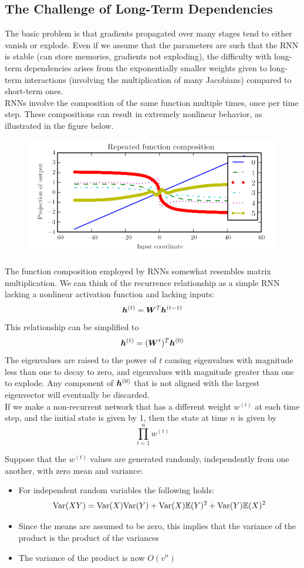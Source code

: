 \begin{multicols}{2}
	\subsection{The Challenge of Long-Term Dependencies}
	The basic problem is that gradients propagated over many stages tend to either vanish or explode.
	Even if we assume that the parameters are such that the RNN is stable (can store memories, gradients not exploding), the difficulty with long-term dependencies arises from the exponentially smaller weights given to long-term interactions (involving the multiplication of many Jacobians) compared to short-term ones.\\
	RNNs involve the composition of the same function multiple times, once per time step.
	These compositions can result in extremely nonlinear behavior, as illustrated in the figure below.
	\begin{figure}[H]
		\centering
		\includegraphics[width=0.9\linewidth]{images/unstable.png}
	\end{figure}
	The function composition employed by RNNs somewhat resembles matrix multiplication.
	We can think of the recurrence relationship as a simple RNN lacking a nonlinear activation function and lacking inputs:
	\[ {\bm{h}}^{(t)} = {\bm{W}}^T{\bm{h}}^{(t-1)} \]
	This relationship can be simplified to
	\[ {\bm{h}}^{(t)} = ({\bm{W}}^t)^T {\bm{h}}^{(0)} \]
	The eigenvalues are raised to the power of $t$ causing eigenvalues with magnitude less than one to decay to zero, and eigenvalues with magnitude greater than one to explode.
	Any component of ${\bm{h}}^{(0)}$ that is not aligned with the largest eigenvector will eventually be discarded.\\

	If we make a non-recurrent network that has a different weight $w^{(t)}$ at each time step, and the initial state is given by 1, then the state at time $n$ is given by
	\[ \prod_{t=1}^{n}w^{(t)} \]

	Suppose that the $w^{(t)}$ values are generated randomly, independently from one another, with zero mean and variance:
	\begin{itemize}
		\item For independent random variables the following holds:
		\[ \text{Var}(XY) = \text{Var}(X)\text{Var}(Y)+\text{Var}(X)\mathbb{E}(Y)^2+\text{Var}(Y)\mathbb{E}(X)^2 \]
		\item Since the means are assumed to be zero, this implies that the variance of the product is the product of the variances
		\item The variance of the product is now $O(v^n)$
	\end{itemize}


\end{multicols}
